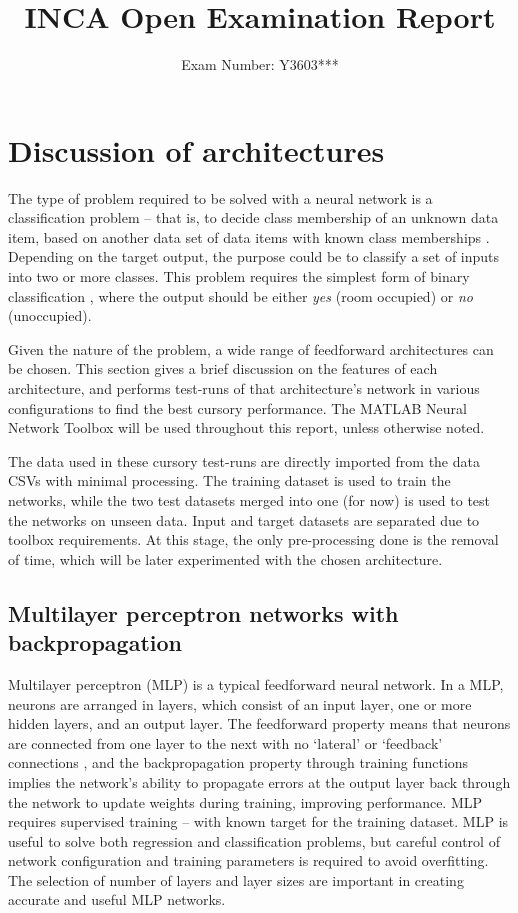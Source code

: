\documentclass[10pt, oneside]{article}
\title{\vspace{-1.6cm}INCA Open Examination Report}
\author{Exam Number: Y3603***}
\date{}
\begin{document}
\maketitle
\section{Discussion of architectures}
The type of problem required to be solved with a neural network is a classification problem -- that is, to decide class membership of an unknown data item, based on another data set of data items with known class memberships \cite[Sec. 2]{Dreiseitl2002352}. Depending on the target output, the purpose could be to classify a set of inputs into two or more classes. This problem requires the simplest form of binary classification \cite[Fig. 4]{candanedo2016accurate}, where the output should be either \textit{yes} (room occupied) or \textit{no} (unoccupied). 

Given the nature of the problem, a wide range of feedforward architectures can be chosen. This section gives a brief discussion on the features of each architecture, and performs test-runs of that architecture's network in various configurations to find the best cursory performance. The MATLAB Neural Network Toolbox \cite{kohonen2014matlab} will be used throughout this report, unless otherwise noted.

The data used in these cursory test-runs are directly imported from the data CSVs with minimal processing. The training dataset is used to train the networks, while the two test datasets merged into one (for now) is used to test the networks on unseen data. Input and target datasets are separated due to toolbox requirements. At this stage, the only pre-processing done is the removal of time, which will be later experimented with the chosen architecture.

\subsection{Multilayer perceptron networks with backpropagation}

Multilayer perceptron (MLP) is a typical feedforward neural network. In a MLP, neurons are arranged in layers, which consist of an input layer, one or more hidden layers, and an output layer. The feedforward property means that neurons are connected from one layer to the next with no `lateral' or `feedback' connections \cite{som-lecture}, and the backpropagation property through training functions implies the network's ability to propagate errors at the output layer back through the network to update weights during training, improving performance. MLP requires supervised training -- with known target for the training dataset. MLP is useful to solve both regression and classification problems, but careful control of network configuration and training parameters is required to avoid overfitting. The selection of number of layers and layer sizes are important in creating accurate and useful MLP networks.
\end{document}
